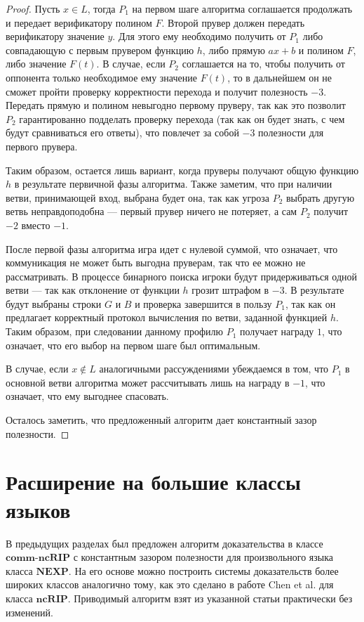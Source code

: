 \documentclass[14pt, a4paper]{extreport}
\begin{document}
\begin{proof}
        Пусть $x \in L$, тогда $P_1$ на первом шаге алгоритма соглашается продолжать и передает верификатору полином $F$. Второй прувер должен передать верификатору значение $y$. Для этого ему необходимо получить от $P_1$ либо совпадающую с первым прувером функцию $h$, либо прямую $a x + b$ и полином $F$, либо значение $F(t)$. В случае, если $P_2$ соглашается на то, чтобы получить от оппонента только необходимое ему значение $F(t)$, то в дальнейшем он не сможет пройти проверку корректности перехода и получит полезность $-3$. Передать прямую и полином невыгодно первому пруверу, так как это позволит $P_2$ гарантированно подделать проверку перехода (так как он будет знать, с чем будут сравниваться его ответы), что повлечет за собой $-3$ полезности для первого прувера.

        Таким образом, остается лишь вариант, когда пруверы получают общую функцию $h$ в результате первичной фазы алгоритма. Также заметим, что при наличии ветви, принимающей вход, выбрана будет она, так как угроза $P_2$ выбрать другую ветвь неправдоподобна --- первый прувер ничего не потеряет, а сам $P_2$ получит $-2$ вместо $-1$.

        После первой фазы алгоритма игра идет с нулевой суммой, что означает, что коммуникация не может быть выгодна пруверам, так что ее можно не рассматривать. В процессе бинарного поиска игроки будут придерживаться одной ветви --- так как отклонение от функции $h$ грозит штрафом в $-3$. В результате будут выбраны строки $G$ и $B$ и проверка завершится в пользу $P_1$, так как он предлагает корректный протокол вычисления по ветви, заданной функцией $h$. Таким образом, при следовании данному профилю $P_1$ получает награду $1$, что означает, что его выбор на первом шаге был оптимальным.

        В случае, если $x \notin L$ аналогичными рассуждениями убеждаемся в том, что $P_1$ в основной ветви алгоритма может рассчитывать лишь на награду в $-1$, что означает, что ему выгоднее спасовать.

        Осталось заметить, что предложенный алгоритм дает константный зазор полезности.
    \end{proof}
        \section{Расширение на большие классы языков}
        В предыдущих разделах был предложен алгоритм доказательства в классе $\textbf{comm-ncRIP}$ с константным зазором полезности для произвольного языка класса $\textbf{NEXP}$. На его основе можно построить системы доказательств более широких классов аналогично тому, как это сделано в работе Chen et al. \cite{chen2017noncoop} для класса $\textbf{ncRIP}$. Приводимый алгоритм взят из указанной статьи практически без изменений.
\end{document}
